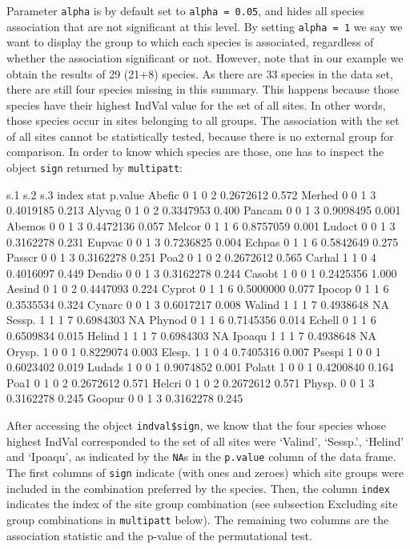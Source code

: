 \documentclass[11pt,a4paper]{article}
\begin{document}
Parameter \texttt{alpha} is by default set to \texttt{alpha = 0.05}, and hides all species association that are not significant at this level. By setting \texttt{alpha = 1} we say we want to display the group to which each species is associated, regardless of whether the association significant or not. However, note that in our example we obtain the results of 29 (21+8) species. As there are 33 species in the data set, there are still four species missing in this summary. This happens because those species have their highest IndVal value for the set of all sites. In other words, those species occur in sites belonging to all groups. The association with the set of all sites cannot be statistically tested, because there is no external group for comparison. In order to know which species are those, one has to inspect the object \texttt{sign} returned by \texttt{multipatt}:
\begin{Schunk}
\begin{Soutput}
       s.1 s.2 s.3 index      stat p.value
Abefic   0   1   0     2 0.2672612   0.572
Merhed   0   0   1     3 0.4019185   0.213
Alyvag   0   1   0     2 0.3347953   0.400
Pancam   0   0   1     3 0.9098495   0.001
Abemos   0   0   1     3 0.4472136   0.057
Melcor   0   1   1     6 0.8757059   0.001
Ludoct   0   0   1     3 0.3162278   0.231
Eupvac   0   0   1     3 0.7236825   0.004
Echpas   0   1   1     6 0.5842649   0.275
Passcr   0   0   1     3 0.3162278   0.251
Poa2     0   1   0     2 0.2672612   0.565
Carhal   1   1   0     4 0.4016097   0.449
Dendio   0   0   1     3 0.3162278   0.244
Casobt   1   0   0     1 0.2425356   1.000
Aesind   0   1   0     2 0.4447093   0.224
Cyprot   0   1   1     6 0.5000000   0.077
Ipocop   0   1   1     6 0.3535534   0.324
Cynarc   0   0   1     3 0.6017217   0.008
Walind   1   1   1     7 0.4938648      NA
Sessp.   1   1   1     7 0.6984303      NA
Phynod   0   1   1     6 0.7145356   0.014
Echell   0   1   1     6 0.6509834   0.015
Helind   1   1   1     7 0.6984303      NA
Ipoaqu   1   1   1     7 0.4938648      NA
Orysp.   1   0   0     1 0.8229074   0.003
Elesp.   1   1   0     4 0.7405316   0.007
Psespi   1   0   0     1 0.6023402   0.019
Ludads   1   0   0     1 0.9074852   0.001
Polatt   1   0   0     1 0.4200840   0.164
Poa1     0   1   0     2 0.2672612   0.571
Helcri   0   1   0     2 0.2672612   0.571
Physp.   0   0   1     3 0.3162278   0.245
Goopur   0   0   1     3 0.3162278   0.245
\end{Soutput}
\end{Schunk}
After accessing the object \texttt{indval\$sign}, we know that the four species whose highest IndVal corresponded to the set of all sites were `Valind', `Sessp.', `Helind' and `Ipoaqu', as indicated by the \texttt{NA}s in the \texttt{p.value} column of the data frame. The first columns of \texttt{sign} indicate (with ones and zeroes) which site groups were included in the combination preferred by the species. Then, the column \texttt{index} indicates the index of the site group combination (see subsection Excluding site group combinations in \texttt{multipatt} below). The remaining two columns are the association statistic and the p-value of the permutational test.
\end{document}
